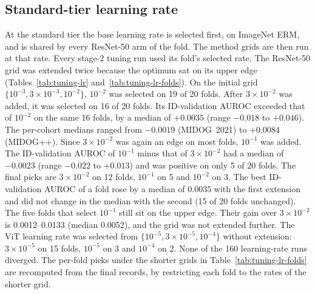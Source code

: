 \subsection{Standard-tier learning rate}
\label{app:tuning-lr}

At the standard tier the base learning rate is selected first, on ImageNet ERM,
and is shared by every ResNet-50 arm of the fold. The method grids are then run
at that rate. Every stage-2 tuning run used its fold's selected rate. The
ResNet-50 grid was extended twice because the optimum sat on its upper edge
(Tables~\ref{tab:tuning-lr} and~\ref{tab:tuning-lr-folds}). On the initial grid
$\{10^{-3},3\times10^{-3},10^{-2}\}$, $10^{-2}$ was selected on 19 of 20 folds.
After $3\times10^{-2}$ was added, it was selected on 16 of 20 folds. Its
ID-validation AUROC exceeded that of $10^{-2}$ on the same 16 folds, by a
median of $+0.0035$ (range $-0.018$ to $+0.046$). The per-cohort medians ranged
from $-0.0019$ (MIDOG~2021) to $+0.0084$ (MIDOG++). Since $3\times10^{-2}$ was
again an edge on most folds, $10^{-1}$ was added. The ID-validation AUROC of
$10^{-1}$ minus that of $3\times10^{-2}$ had a median of $-0.0023$ (range
$-0.022$ to $+0.013$) and was positive on only 5 of 20 folds. The final picks are
$3\times10^{-2}$ on 12 folds, $10^{-1}$ on 5 and $10^{-2}$ on 3. The best
ID-validation AUROC of a fold rose by a median of 0.0035 with the first
extension and did not change in the median with the second (15 of 20 folds
unchanged). The five folds that select $10^{-1}$ still sit on the upper edge.
Their gain over $3\times10^{-2}$ is 0.0012--0.0133 (median 0.0052), and the
grid was not extended further. The ViT learning rate was selected from
$\{10^{-5},3\times10^{-5},10^{-4}\}$ without extension: $3\times10^{-5}$ on 15
folds, $10^{-5}$ on 3 and $10^{-4}$ on 2. None of the 160 learning-rate runs
diverged. The per-fold picks under the shorter grids in
Table~\ref{tab:tuning-lr-folds} are recomputed from the final records, by
restricting each fold to the rates of the shorter grid.

